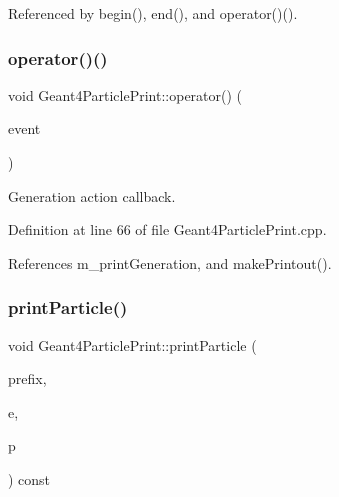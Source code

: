 Referenced by begin(), end(), and operator()().

\hypertarget{class_d_d4hep_1_1_simulation_1_1_geant4_particle_print_a6aa380c89db0f6359ba163e196b50938}{}\label{class_d_d4hep_1_1_simulation_1_1_geant4_particle_print_a6aa380c89db0f6359ba163e196b50938} 
\subsubsection{\texorpdfstring{operator()()}{operator()()}}
{\footnotesize\ttfamily void Geant4\+Particle\+Print\+::operator() (\begin{DoxyParamCaption}\item[{G4\+Event $\ast$}]{event }\end{DoxyParamCaption})\hspace{0.3cm}{\ttfamily [virtual]}}



Generation action callback. 



Definition at line 66 of file Geant4\+Particle\+Print.\+cpp.



References m\+\_\+print\+Generation, and make\+Printout().

\hypertarget{class_d_d4hep_1_1_simulation_1_1_geant4_particle_print_ab83c88cd1661b1568e5e9669453edaa4}{}\label{class_d_d4hep_1_1_simulation_1_1_geant4_particle_print_ab83c88cd1661b1568e5e9669453edaa4} 
\subsubsection{\texorpdfstring{print\+Particle()}{printParticle()}}
{\footnotesize\ttfamily void Geant4\+Particle\+Print\+::print\+Particle (\begin{DoxyParamCaption}\item[{const std\+::string \&}]{prefix,  }\item[{const G4\+Event $\ast$}]{e,  }\item[{\hyperlink{class_d_d4hep_1_1_simulation_1_1_geant4_particle_handle}{Geant4\+Particle\+Handle}}]{p }\end{DoxyParamCaption}) const\hspace{0.3cm}{\ttfamily [protected]}}



